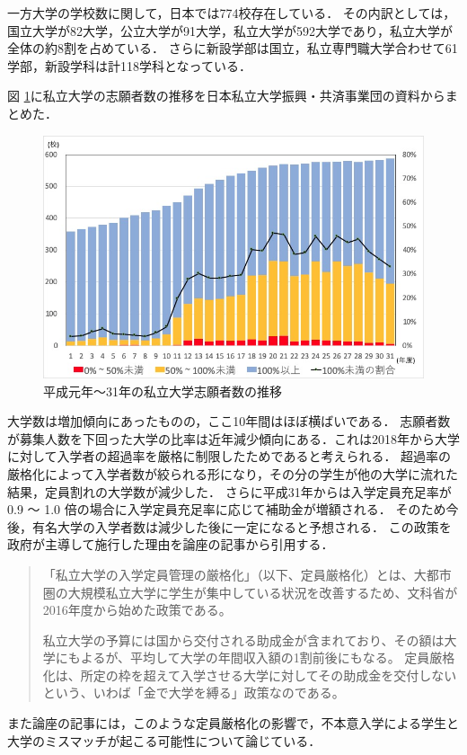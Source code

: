 一方大学の学校数に関して，日本では774校存在している\cite{university_num}．
その内訳としては，国立大学が82大学，公立大学が91大学，私立大学が592大学であり，私立大学が全体の約8割を占めている．
さらに新設学部は国立，私立専門職大学合わせて61学部，新設学科は計118学科となっている．

図 \ref{fig:shigan}に私立大学の志願者数の推移を日本私立大学振興・共済事業団の資料\cite{shigan}からまとめた．
\begin{figure}[H]
\centering
\includegraphics[scale=0.53]{images/shigansya.jpg}
\caption{平成元年〜31年の私立大学志願者数の推移}
\label{fig:shigan}
\end{figure}
大学数は増加傾向にあったものの，ここ10年間はほぼ横ばいである．
志願者数が募集人数を下回った大学の比率は近年減少傾向にある．これは2018年から大学に対して入学者の超過率を厳格に制限\cite{hojokin1}したためであると考えられる．
超過率の厳格化によって入学者数が絞られる形になり，その分の学生が他の大学に流れた結果，定員割れの大学数が減少した．
さらに平成31年からは入学定員充足率が 0.9 〜 1.0 倍の場合に入学定員充足率に応じて補助金が増額される\cite{hojokin2}．
そのため今後，有名大学の入学者数は減少した後に一定になると予想される．
この政策を政府が主導して施行した理由を論座の記事\cite{ronza}から引用する．
\begin{quotation}
「私立大学の入学定員管理の厳格化」（以下、定員厳格化）とは、大都市圏の大規模私立大学に学生が集中している状況を改善するため、文科省が2016年度から始めた政策である。

私立大学の予算には国から交付される助成金が含まれており、その額は大学にもよるが、平均して大学の年間収入額の1割前後にもなる。
定員厳格化は、所定の枠を超えて入学させる大学に対してその助成金を交付しないという、いわば「金で大学を縛る」政策なのである。
\end{quotation}
また論座の記事には，このような定員厳格化の影響で，不本意入学による学生と大学のミスマッチが起こる可能性について論じている．

